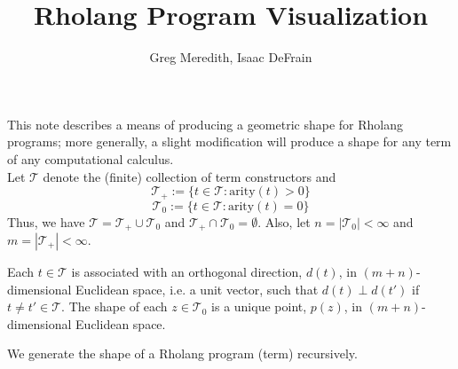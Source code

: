 \documentclass[12pt]{article}
\numberwithin{equation}{section}
\begin{document}
\author{Greg Meredith, Isaac DeFrain}
\date{}
\title{Rholang Program Visualization}

\maketitle
This note describes a means of producing a geometric shape for Rholang programs; more generally, a slight modification will produce a shape for any term of any computational calculus. \\

Let $\mathcal{T}$ denote the (finite) collection of term constructors and
\[ \mathcal{T}_+ := \{ t \in \mathcal{T} : \text{arity}(t)>0 \} \]
\[ \mathcal{T}_0 := \{ t \in \mathcal{T} : \text{arity}(t)=0 \} \]
Thus, we have $\mathcal{T} = \mathcal{T}_+ \cup \mathcal{T}_0$ and  $\mathcal{T}_+ \cap \mathcal{T}_0 = \emptyset$. Also, let $n = |\mathcal{T}_0| < \infty$ and $m = |\mathcal{T}_+| < \infty$.

Each $t \in \mathcal{T}$ is associated with an orthogonal direction, $d(t)$, in $(m+n)$-dimensional Euclidean space, i.e. a unit vector, such that $d(t) \perp d(t')$ if $t \neq t' \in \mathcal{T}$. The shape of each $z \in \mathcal{T}_0$ is a unique point, $p( z )$, in $(m+n)$-dimensional Euclidean space.

We generate the shape of a Rholang program (term) recursively.
\end{document}
